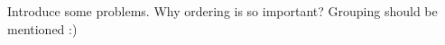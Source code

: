 
\label {fs-tasks}

Introduce some problems. Why ordering is so important? Grouping should be mentioned :)
